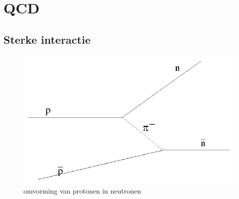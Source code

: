 \documentclass[../main.tex]{subfiles}
\begin{document}
\newpage

\section{QCD}%
\label{sec:qcd}

\subsection{Sterke interactie}%
\label{sub:sterke_interactie}

\begin{figure}[h]
    \centering
    \includegraphics[width=0.6\linewidth]{QCD/ppnn.png}
    \caption{omvorming van protonen in neutronen}%
    \label{fig:ppnn}
\end{figure}
\end{document}
